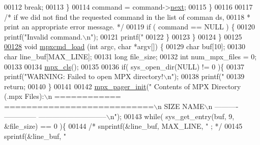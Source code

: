 \begin{DoxyCode}
{{{00112                                 \textcolor{keywordflow}{break};
00113                         \}
00114                         command = command->\hyperlink{structmpx__cmd_a863c991d0d31b283791615b5f5fe03bb}{next};
00115                 \}
00116 
00117                 \textcolor{comment}{/* if we did not find the requested command in the list of comman
      ds,}
00118 \textcolor{comment}{                 * print an appropriate error message. */}
00119                 \textcolor{keywordflow}{if} ( command == NULL ) \{
00120                          printf(\textcolor{stringliteral}{"Invalid command.\(\backslash\)n"});
00121                          printf(\textcolor{stringliteral}{"%
00122                 \}
00123         \}
00124 \}
00125 
\hypertarget{mpx__cmd_8c_source_l00128}{}\hyperlink{mpx__cmd_8h_ab121952706478a3ce5951ab91298d391}{00128} \textcolor{keywordtype}{void} \hyperlink{mpx__cmd_8c_ab121952706478a3ce5951ab91298d391}{mpxcmd_load} (\textcolor{keywordtype}{int} argc, \textcolor{keywordtype}{char} *argv[]) \{
00129         \textcolor{keywordtype}{char} buf[10];
00130         \textcolor{keywordtype}{char} line\_buf[MAX\_LINE];
00131         \textcolor{keywordtype}{long} file\_size;
00132         \textcolor{keywordtype}{int}  num\_mpx\_files = 0;
00133 
00134         \hyperlink{mpx__util_8c_a8cf3281978ba1652fd5d643e1a41f70b}{mpx_cls}();
00135 
00136         \textcolor{keywordflow}{if}( sys\_open\_dir(NULL) != 0 )\{
00137                 printf(\textcolor{stringliteral}{"WARNING: Failed to open MPX directory!\(\backslash\)n"});
00138                 printf(\textcolor{stringliteral}{"%
00139                 \textcolor{keywordflow}{return};
00140         \}
00141 
00142         \hyperlink{mpx__util_8c_a60afdb7496b6ff469c6b98d2ecde15ed}{mpx_pager_init}(\textcolor{stringliteral}{"  Contents of MPX Directory (.mpx Files):\(\backslash\)n  ============
      ===========================\(\backslash\)n    SIZE        NAME\(\backslash\)n    ----------  --------------
      -----------------------------\(\backslash\)n"});
00143         \textcolor{keywordflow}{while}( sys\_get\_entry(buf, 9, &file\_size) == 0 )\{
00144                 \textcolor{comment}{/* snprintf(&line\_buf, MAX\_LINE, "    %
      ; */}
00145                 sprintf(&line\_buf, \textcolor{stringliteral}{"    %
}}}}}}
\end{DoxyCode}
